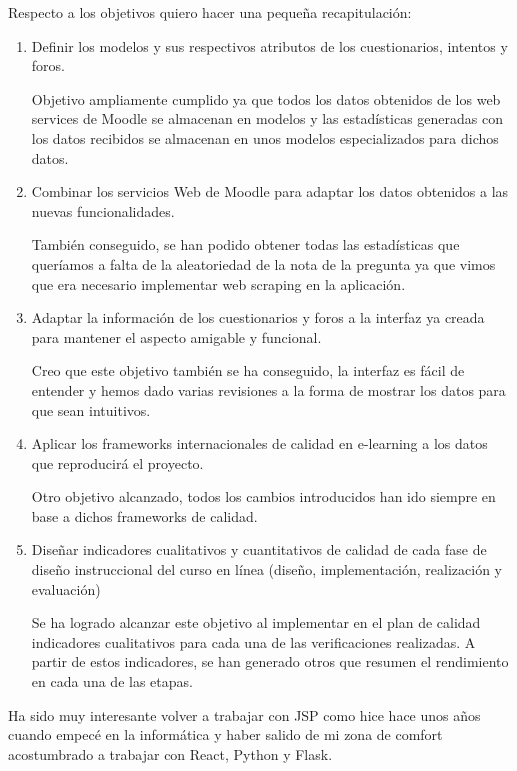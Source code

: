 Respecto a los objetivos quiero hacer una pequeña recapitulación:
\begin{enumerate}
    \item Definir los modelos y sus respectivos atributos de los cuestionarios, intentos y foros.

    Objetivo ampliamente cumplido ya que todos los datos obtenidos de los web services de Moodle se almacenan en modelos y las estadísticas generadas con los datos recibidos se almacenan en unos modelos especializados para dichos datos.
    
    \item Combinar los servicios Web de Moodle para adaptar los datos obtenidos a las nuevas funcionalidades.

    También conseguido, se han podido obtener todas las estadísticas que queríamos a falta de la aleatoriedad de la nota de la pregunta ya que vimos que era necesario implementar web scraping en la aplicación.
    
    \item Adaptar la información de los cuestionarios y foros a la interfaz ya creada para mantener el aspecto amigable y funcional.

    Creo que este objetivo también se ha conseguido, la interfaz es fácil de entender y hemos dado varias revisiones a la forma de mostrar los datos para que sean intuitivos.
    
    \item Aplicar los frameworks internacionales de calidad en e-learning a los datos que reproducirá el proyecto.

    Otro objetivo alcanzado, todos los cambios introducidos han ido siempre en base a dichos frameworks de calidad.
    
    \item Diseñar indicadores cualitativos y cuantitativos de calidad de cada fase de diseño instruccional del curso en línea (diseño, implementación, realización y evaluación)\cite{previotfg}

    Se ha logrado alcanzar este objetivo al implementar en el plan de calidad indicadores cualitativos para cada una de las verificaciones realizadas. A partir de estos indicadores, se han generado otros que resumen el rendimiento en cada una de las etapas.
\end{enumerate}

Ha sido muy interesante volver a trabajar con JSP como hice hace unos años cuando empecé en la informática y haber salido de mi zona de comfort acostumbrado a trabajar con React, Python y Flask.

